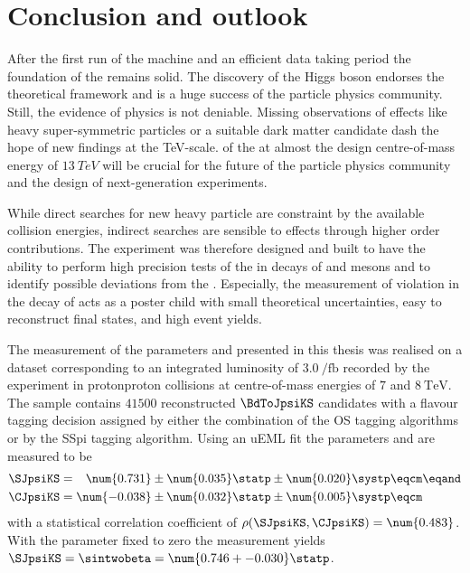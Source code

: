 
\chapter{Conclusion and outlook}
\label{ch:conclusion}

After the first run of the \LHC machine and an efficient data taking period the
foundation of the \SM remains solid. The discovery of the Higgs boson
\cite{Aad:2015zhl} endorses the theoretical framework and is a huge success of
the particle physics community. Still, the evidence of \BSM physics is not
deniable. Missing observations of \BSM effects like heavy super-symmetric
particles or a suitable dark matter candidate dash the hope of new findings at
the \si{TeV}-scale. \RunTwo of the \LHC at almost the design centre-of-mass
energy of $\SI{13}{TeV}$ will be crucial for the future of the particle physics
community and the design of next-generation experiments.

While direct searches for new heavy particle are constraint by the available
collision energies, indirect searches are sensible to \BSM effects through
higher order contributions. The \LHCb experiment was therefore designed and
built to have the ability to perform high precision tests of the \SM in decays
of \B and \D mesons and to identify possible deviations from the \SM.
Especially, the measurement of \CP violation in the decay of \BdToJpsiKS acts as
a poster child with small theoretical uncertainties, easy to reconstruct final
states, and high event yields.

The measurement of the \CP parameters \SJpsiKS and \CJpsiKS presented in this
thesis was realised on a dataset corresponding to an integrated luminosity of
$\SI{3.0}{\per\femto\barn}$ recorded by the \LHCb experiment in
\acl{protonproton} collisions at centre-of-mass energies of $\num{7}$ and
$\SI{8}{\TeV}$. The sample contains $\num{41500}$ reconstructed $\BdToJpsiKS$
candidates with a flavour tagging decision assigned by either the combination of
the \acl{OS} tagging algorithms or by the \acl{SSpi} tagging algorithm. Using an
\acl{uEML} fit the \CP parameters \SJpsiKS and \CJpsiKS are measured to be
%
\begin{equation*}
  \begin{split}
    \SJpsiKS &= \phantom{-}\num{0.731} \pm \num{0.035} \statp \pm \num{0.020} \systp \eqcm\eqand \\
    \CJpsiKS &=           \num{-0.038} \pm \num{0.032} \statp \pm \num{0.005} \systp \eqcm
  \end{split}
\end{equation*}
%
with a statistical correlation coefficient of $\rho(\SJpsiKS,\CJpsiKS) =
\num{0.483}$. With the parameter \CJpsiKS fixed to zero the measurement yields
$\SJpsiKS = \sintwobeta = \num{0.746 +- 0.030}\statp$.

